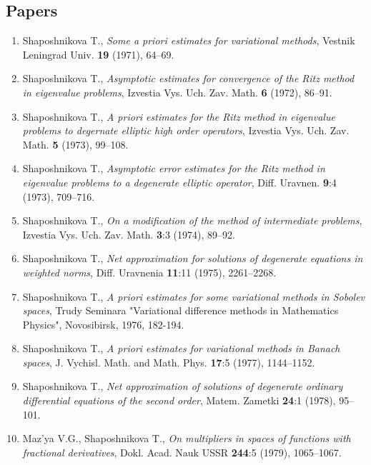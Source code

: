 \documentclass{article}
\begin{document}
\subsection*{Papers}

\begin{enumerate}
\item Shaposhnikova T., {\it Some a priori estimates for variational
methods}, Vestnik
Leningrad Univ. {\bf 19} (1971), 64--69.

\item Shaposhnikova T., {\it Asymptotic estimates for convergence of
the Ritz method in
eigenvalue problems}, Izvestia Vys. Uch. Zav. Math. {\bf 6} (1972),
86--91.

\item Shaposhnikova T., {\it A priori estimates for the Ritz method
in eigenvalue problems
to degernate elliptic high order operators}, Izvestia Vys. Uch. Zav.
Math. {\bf 5} (1973), 99--108.

\item Shaposhnikova T., {\it Asymptotic error estimates for the Ritz
method in eigenvalue
problems to a degenerate elliptic operator}, Diff. Uravnen. {\bf 9}:4
(1973), 709--716.

\item Shaposhnikova T., {\it On a modification of the method of
intermediate problems},
Izvestia Vys. Uch. Zav. Math. {\bf 3}:3 (1974), 89--92.

\item Shaposhnikova T., {\it Net approximation for solutions of
degenerate equations in
weighted norms}, Diff. Uravnenia {\bf 11}:11 (1975), 2261--2268.

\item Shaposhnikova T., {\it A priori estimates for some variational
methods in Sobolev
spaces}, Trudy Seminara "Variational difference methods in Mathematics
Phy\-sics", Novosibirsk, 1976, 182-194.

\item Shaposhnikova T., {\it A priori estimates for variational
methods in Banach spaces},
J. Vychisl. Math. and Math. Phys. {\bf 17}:5 (1977), 1144--1152.

\item Shaposhnikova T., {\it Net approximation of solutions of
degenerate ordinary
differential equ\-ations of the second order}, Matem. Zametki {\bf
24}:1 (1978), 95--101.

\item Maz'ya V.G., Shaposhnikova T., {\it On multipliers in spaces of
functions with fractional
derivatives}, Dokl. Acad. Nauk USSR {\bf 244}:5 (1979), 1065--1067.


\end{enumerate}
\end{document}
